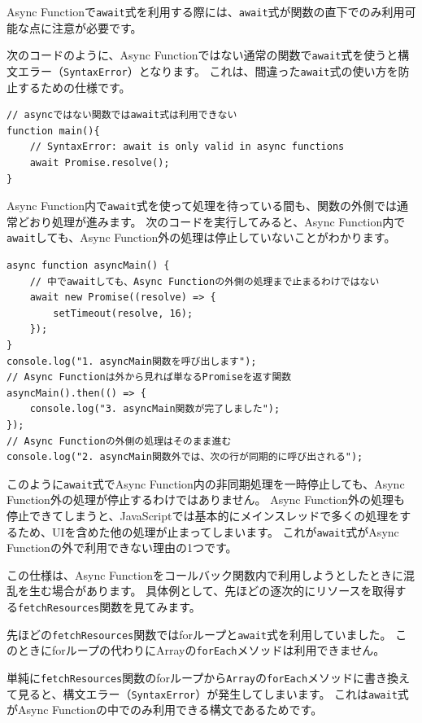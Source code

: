 Async Functionで\texttt{await}式を利用する際には、\texttt{await}式が関数の直下でのみ利用可能な点に注意が必要です。

次のコードのように、Async
Functionではない通常の関数で\texttt{await}式を使うと構文エラー（\texttt{SyntaxError}）となります。
これは、間違った\texttt{await}式の使い方を防止するための仕様です。

\begin{lstlisting}
// asyncではない関数ではawait式は利用できない
function main(){
    // SyntaxError: await is only valid in async functions
    await Promise.resolve();
}
\end{lstlisting}

Async
Function内で\texttt{await}式を使って処理を待っている間も、関数の外側では通常どおり処理が進みます。
次のコードを実行してみると、Async
Function内で\texttt{await}しても、Async
Function外の処理は停止していないことがわかります。

\begin{lstlisting}
async function asyncMain() {
    // 中でawaitしても、Async Functionの外側の処理まで止まるわけではない
    await new Promise((resolve) => {
        setTimeout(resolve, 16);
    });
}
console.log("1. asyncMain関数を呼び出します");
// Async Functionは外から見れば単なるPromiseを返す関数
asyncMain().then(() => {
    console.log("3. asyncMain関数が完了しました");
});
// Async Functionの外側の処理はそのまま進む
console.log("2. asyncMain関数外では、次の行が同期的に呼び出される");
\end{lstlisting}

このように\texttt{await}式でAsync
Function内の非同期処理を一時停止しても、Async
Function外の処理が停止するわけではありません。 Async
Function外の処理も停止できてしまうと、JavaScriptでは基本的にメインスレッドで多くの処理をするため、UIを含めた他の処理が止まってしまいます。
これが\texttt{await}式がAsync
Functionの外で利用できない理由の1つです。

この仕様は、Async
Functionをコールバック関数内で利用しようとしたときに混乱を生む場合があります。
具体例として、先ほどの逐次的にリソースを取得する\texttt{fetchResources}関数を見てみます。

先ほどの\texttt{fetchResources}関数ではforループと\texttt{await}式を利用していました。
このときにforループの代わりにArrayの\texttt{forEach}メソッドは利用できません。

単純に\texttt{fetchResources}関数のforループから\texttt{Array}の\texttt{forEach}メソッドに書き換えて見ると、構文エラー（\texttt{SyntaxError}）が発生してしまいます。
これは\texttt{await}式がAsync
Functionの中でのみ利用できる構文であるためです。

